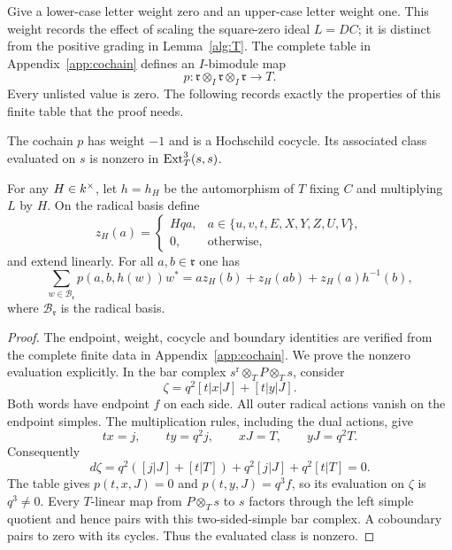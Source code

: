 Give a lower-case letter weight zero and an upper-case letter weight
one.  This weight records the effect of scaling the square-zero ideal
$L=DC$; it is distinct from the positive grading in
Lemma~\ref{alg:T}.  The complete table in Appendix~\ref{app:cochain}
defines an $I$-bimodule map
\[
 p:\mathfrak r\otimes_I\mathfrak r\otimes_I\mathfrak r\longrightarrow T.
\]
Every unlisted value is zero.  The following records exactly the
properties of this finite table that the proof needs.

\begin{lemma}\label{coc:data}
The cochain $p$ has weight $-1$ and is a Hochschild cocycle.  Its
associated class evaluated on $s$ is nonzero in $\operatorname{Ext}_T^3(s,s)$.

For any $H\in k^\times$, let $h=h_H$ be the automorphism of $T$
fixing $C$ and multiplying $L$ by $H$.  On the radical basis define
\[
 z_H(a)=
 \begin{cases}
 Hqa,&a\in\{u,v,t,E,X,Y,Z,U,V\},\\
 0,&\text{otherwise},
 \end{cases}
\]
and extend linearly.  For all $a,b\in\mathfrak r$ one has
\begin{equation}
 \sum_{w\in\mathcal B_{\mathfrak r}}
      p(a,b,h(w))w^*
  =a z_H(b)+z_H(ab)+z_H(a)h^{-1}(b),
\label{coc:boundary}
\end{equation}
where $\mathcal B_{\mathfrak r}$ is the radical basis.
\end{lemma}

\begin{proof}
The endpoint, weight, cocycle and boundary identities are verified
from the complete finite data in Appendix~\ref{app:cochain}.
We prove the nonzero evaluation explicitly.  In the bar complex
$s^{\mathrm r}\otimes_T P\otimes_T s$, consider
\begin{equation}
 \zeta=q^2[t|x|J]+[t|y|J].
\label{coc:cycle}
\end{equation}
Both words have endpoint $f$ on each side.  All outer radical
actions vanish on the endpoint simples.  The multiplication rules,
including the dual actions, give
\[
 tx=j,\qquad ty=q^2j,\qquad xJ=T,\qquad yJ=q^2T.
\]
Consequently
\[
 d\zeta=q^2([j|J]+[t|T])+q^2[j|J]+q^2[t|T]=0.
\]
The table gives $p(t,x,J)=0$ and $p(t,y,J)=q^3f$, so its evaluation on
$\zeta$ is $q^3\ne0$.  Every $T$-linear map from $P\otimes_T s$ to
$s$ factors through the left simple quotient and hence pairs with
this two-sided-simple bar complex.  A coboundary pairs to zero with
its cycles.  Thus the evaluated class is nonzero.
\end{proof}

